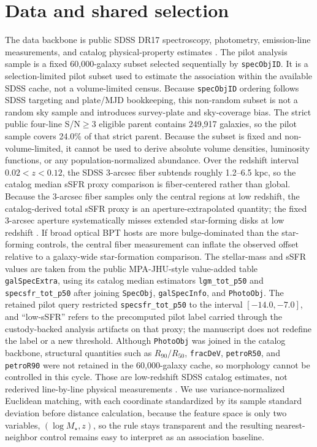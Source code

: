 \documentclass[twocolumn]{aastex631}
\begin{document}
\section{Data and shared selection}
The data backbone is public SDSS DR17 spectroscopy, photometry, emission-line measurements, and catalog physical-property estimates \citep{york2000,sdssdr17,brinchmann2004}. The pilot analysis sample is a fixed 60,000-galaxy subset selected sequentially by \texttt{specObjID}. It is a selection-limited pilot subset used to estimate the association within the available SDSS cache, not a volume-limited census. Because \texttt{specObjID} ordering follows SDSS targeting and plate/MJD bookkeeping, this non-random subset is not a random sky sample and introduces survey-plate and sky-coverage bias. The strict public four-line S/N$\geq3$ eligible parent contains 249,917 galaxies, so the pilot sample covers 24.0\% of that strict parent. Because the subset is fixed and non-volume-limited, it cannot be used to derive absolute volume densities, luminosity functions, or any population-normalized abundance.
Over the redshift interval $0.02<z<0.12$, the SDSS 3-arcsec fiber subtends roughly 1.2--6.5 kpc, so the catalog median sSFR proxy comparison is fiber-centered rather than global.
Because the 3-arcsec fiber samples only the central regions at low redshift, the catalog-derived total sSFR proxy is an aperture-extrapolated quantity; the fixed 3-arcsec aperture systematically misses extended star-forming disks at low redshift \citep{kewley2005}. If broad optical BPT hosts are more bulge-dominated than the star-forming controls, the central fiber measurement can inflate the observed offset relative to a galaxy-wide star-formation comparison.
The stellar-mass and sSFR values are taken from the public MPA-JHU-style value-added table \texttt{galSpecExtra}, using its catalog median estimators \texttt{lgm\_tot\_p50} and \texttt{specsfr\_tot\_p50} after joining \texttt{SpecObj}, \texttt{galSpecInfo}, and \texttt{PhotoObj}. The retained pilot query restricted \texttt{specsfr\_tot\_p50} to the interval \([-14.0,-7.0]\), and ``low-sSFR'' refers to the precomputed pilot label carried through the custody-backed analysis artifacts on that proxy; the manuscript does not redefine the label or a new threshold. Although \texttt{PhotoObj} was joined in the catalog backbone, structural quantities such as \(R_{90}/R_{50}\), \texttt{fracDeV}, \texttt{petroR50}, and \texttt{petroR90} were not retained in the 60,000-galaxy cache, so morphology cannot be controlled in this cycle. Those are low-redshift SDSS catalog estimates, not rederived line-by-line physical measurements \citep{brinchmann2004,sdssdr17,york2000}. We use variance-normalized Euclidean matching, with each coordinate standardized by its sample standard deviation before distance calculation, because the feature space is only two variables, $(\log M_\star,z)$, so the rule stays transparent and the resulting nearest-neighbor control remains easy to interpret as an association baseline.
\end{document}
